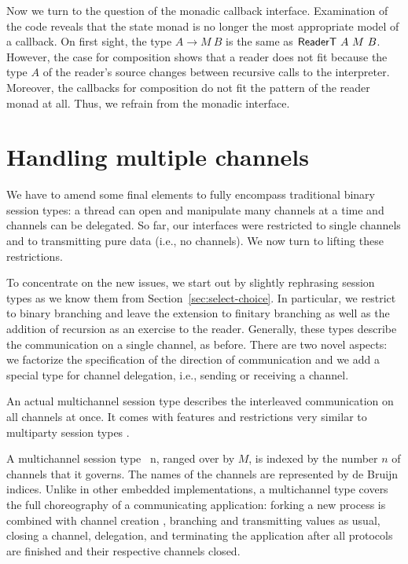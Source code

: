 \documentclass[acmsmall,screen,anonymous,review]{acmart}
\begin{document}
Now we turn to the question of the monadic callback interface. 
Examination of the code reveals that the state monad is no longer the most appropriate model of a
callback. On first sight, the type $A \to 
M~B$ is the same as $\AReaderT~A~M~B $. However, the case 
for composition shows that a reader does not fit because
the type $A$ of the reader's source changes between recursive calls to
the interpreter. Moreover, the callbacks for composition do not fit
the pattern of the reader monad at all.
Thus, we refrain from the monadic interface.


\section{Handling multiple channels}
\label{sec:handl-mult-chann}


We have to amend some final elements to fully encompass traditional binary
session types: a thread can open and manipulate many channels at a
time and channels can be delegated. So far, our interfaces were
restricted to single channels and to transmitting pure data (i.e., no channels). We
now turn to lifting these restrictions.

To concentrate on the new issues, 
we start out by slightly rephrasing session types as we
know them from Section~\ref{sec:select-choice}. In particular, we
restrict to binary branching and leave the extension
to finitary branching as well as the addition of recursion as an
exercise to the reader. Generally, these types describe 
the communication on a single channel, as before. There are two novel
aspects: we factorize the specification of the direction of
communication and we add a special type for channel delegation, i.e.,
sending or receiving a channel.

\multiSession

An actual multichannel session type describes the interleaved
communication on all channels at once. It comes with features and
restrictions very similar to multiparty session types \cite{DBLP:journals/jacm/HondaYC16}.

\multiMSesson

A multichannel session type {\AMSession~n}, ranged over by $M$, is indexed by the number $n$ of
channels that it governs. The names of the channels are represented by
de Bruijn indices. Unlike in other embedded implementations, a
multichannel type covers the full choreography of a communicating
application: forking a new process is combined with channel creation
\cite{where?}, branching and transmitting values as usual, closing a
channel, delegation, and terminating the application after all
protocols are finished and their respective channels closed.
\end{document}
